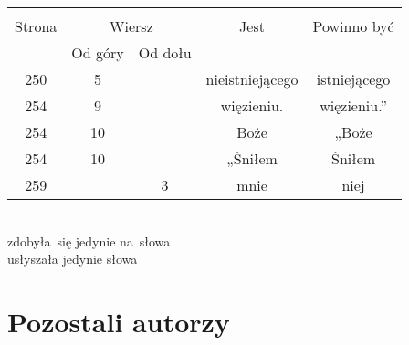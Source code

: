 \documentclass[a4paper,11pt]{article}
\begin{document}
\begin{center}
  \begin{tabular}{|c|c|c|c|c|}
    \hline
    & \multicolumn{2}{c|}{} & & \\
    Strona & \multicolumn{2}{c|}{Wiersz} & Jest
                              & Powinno być \\ \cline{2-3}
    & Od góry & Od dołu & & \\
    \hline
    250 &  5 & & nieistniejącego & istniejącego \\
    254 &  9 & & więzieniu. & więzieniu.'' \\
    254 & 10 & & Boże & „Boże \\
    254 & 10 & & „Śniłem & Śniłem \\
    259 & &  3 & mnie & niej \\
    \hline
  \end{tabular}

\end{center}


\noindent
{} \\
\Jest  zdobyła~się jedynie na~słowa \\
\Powin usłyszała jedynie słowa \\

\vspace{\spaceTwo}










\newpage
\section{Pozostali autorzy}

\vspace{\spaceTwo}
\end{document}
